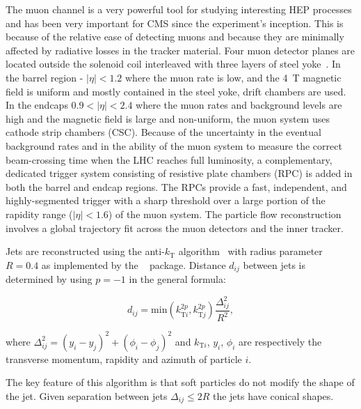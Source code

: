 The muon channel is a very powerful tool for studying interesting HEP processes and has been very important for CMS since the experiment's inception. This is because of the relative ease of detecting muons and because they are minimally affected by radiative losses in the tracker material. Four muon detector planes are located outside the solenoid coil interleaved with three layers of steel yoke~\cite{muon_tech_rep}. In the barrel region - $\left|\eta\right|<1.2$ where the muon rate is low, and the 4~T magnetic field is uniform and mostly contained in the steel yoke, drift chambers are used. In the endcaps $0.9<\left|\eta\right|<2.4$ where the muon rates and background levels are high and the magnetic field is large and non-uniform, the muon system uses cathode strip chambers (CSC). Because of the uncertainty in the eventual background rates and in the ability of the muon system to measure the correct beam-crossing time when the LHC reaches full luminosity, a complementary, dedicated trigger system consisting of resistive plate chambers (RPC) is added in both the barrel and endcap regions. The RPCs provide a fast, independent, and highly-segmented trigger with a sharp \pt threshold over a large portion of the rapidity range ($\left|\eta\right|<1.6$) of the muon system. The particle flow reconstruction involves a global trajectory fit across the muon detectors and the inner tracker. 

Jets are reconstructed using the anti-$k_{\text{T}}$ algorithm~\cite{Cacciari:2008gp} with radius parameter $R=0.4$ as implemented by the \FASTJET~\cite{Cacciari:2011ma} package. Distance $d_{ij}$ between jets is determined by using $p=-1$ in the general formula:

\begin{equation}
d_{ij}=\text{min}(k_{\text{T}i}^{2p}, k_{\text{T}j}^{2p})\frac{\Delta_{ij}^{2}}{R^{2}},
\end{equation}

\noindent where $\Delta_{ij}^{2}=(y_{i}-y_{j})^{2}+(\phi_{i}-\phi_{j})^{2}$ and $k_{\text{T}i}$, $y_{i}$, $\phi_{i}$ are respectively the transverse momentum, rapidity and azimuth of particle $i$. 

The key feature of this algorithm is that soft particles do not modify the shape of the jet. Given separation between jets $\Delta_{ij}\leq2R$ the jets have conical shapes. 
